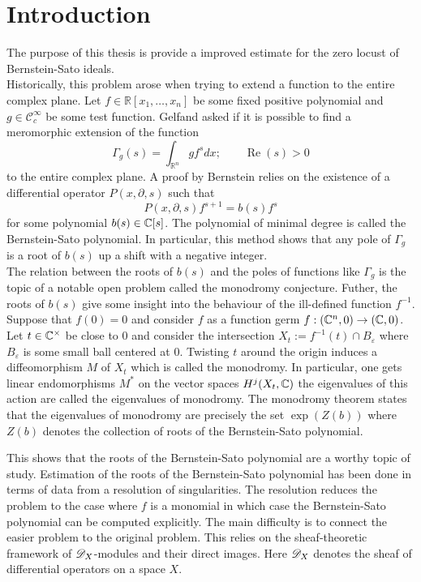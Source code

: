 \chapter*{Introduction} %




The purpose of this thesis is provide a improved estimate for the zero locust of Bernstein-Sato ideals.\\

Historically, this problem arose when trying to extend a function to the entire complex plane.
Let $f\in \mathbb{R}[x_1,\ldots,x_n]$ be some fixed positive polynomial and $g \in \mathcal{C}_c^\infty$ be some test function.
Gelfand asked if it is possible to find a meromorphic extension of the function
$$\Gamma_g(s) = \int_{\mathbb{R}^n} g f^s dx; \qquad \operatorname{Re}(s)>0 $$
to the entire complex plane.
A proof by Bernstein relies on the existence of a differential operator $P(x,\partial, s)$ such that
$$P(x,\partial,s) f^{s+1} = b(s) f^s$$
for some polynomial $b(s)\in \mathbb{C}[s]$.
The polynomial of minimal degree is called the Bernstein-Sato polynomial.
In particular, this method shows that any pole of $\Gamma_g$ is a root of $b(s)$ up a shift with a negative integer.\\

The relation between the roots of $b(s)$ and the poles of functions like $\Gamma_g$ is the topic of a notable open problem called the monodromy conjecture.
Futher, the roots of $b(s)$ give some insight into the behaviour of the ill-defined function $f^{-1}$.
Suppose that $f(0)= 0$ and consider $f$ as a function germ $f:(\mathbb{C}^n,0)\to (\mathbb{C},0)$.
Let $t\in \mathbb{C}^\times$ be close to $0$ and consider the intersection $X_t := f^{-1}(t)\cap B_\varepsilon$ where $B_\varepsilon$ is some small ball centered at $0$.
Twisting $t$ around the origin induces a diffeomorphism $M$ of $X_t$ which is called the monodromy.
In particular, one gets linear endomorphisms $M^*$ on the vector spaces $H^j(X_t,\mathbb{C})$ the eigenvalues of this action are called the eigenvalues of monodromy.
The monodromy theorem states that the eigenvalues of monodromy are precisely the set $\exp(Z(b))$ where $Z(b)$ denotes the collection of roots of the Bernstein-Sato polynomial.

This shows that the roots of the Bernstein-Sato polynomial are a worthy topic of study.
Estimation of the roots of the Bernstein-Sato polynomial has been done in terms of data from a resolution of singularities.
The resolution reduces the problem to the case where $f$ is a monomial in which case the Bernstein-Sato polynomial can be computed explicitly.
The main difficulty is to connect the easier problem to the original problem.
This relies on the sheaf-theoretic framework of $\mathscr{D}_X$-modules and their direct images.
Here $\mathscr{D}_X$ denotes the sheaf of differential operators on a space $X$.

